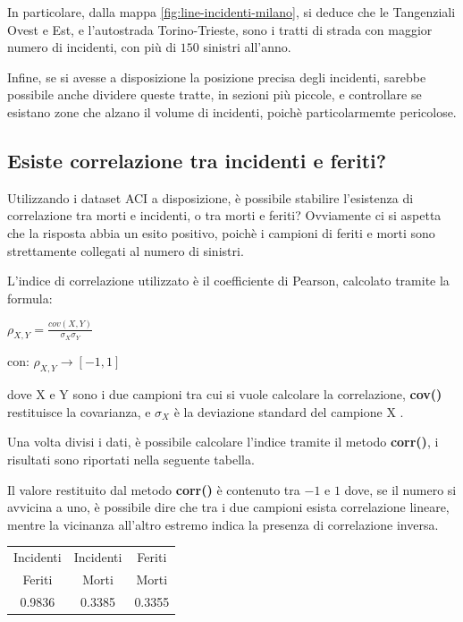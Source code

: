 \documentclass[a4paper,12pt]{report}
\newcommand{\methodstyle}[1]{\textbf{#1}}
\begin{document}
In particolare, dalla mappa \ref{fig:line-incidenti-milano}, si deduce che le 
Tangenziali Ovest e Est, e l'autostrada Torino-Trieste, sono i tratti di 
strada con maggior numero di incidenti, con più di $150$ sinistri all'anno.

Infine, se si avesse a disposizione la posizione precisa degli incidenti, 
sarebbe possibile anche dividere queste tratte, in sezioni più piccole, 
e controllare se esistano zone che alzano il volume di incidenti, poichè 
particolarmemte pericolose.

\subsection{Esiste correlazione tra incidenti e feriti?}

Utilizzando i dataset ACI a disposizione, è possibile stabilire l'esistenza di 
correlazione tra morti e incidenti, o tra morti e feriti?
Ovviamente ci si aspetta che la risposta abbia un esito positivo, poichè 
i campioni di feriti e morti sono strettamente collegati al numero di sinistri.

L'indice di correlazione utilizzato è il coefficiente di Pearson, 
calcolato tramite la formula: 

\begin{center}
    $\rho_{X, Y} = \displaystyle \frac{cov(X, Y)}{\sigma_X \sigma_Y}$
\end{center}

\begin{center}
    con: $\rho_{X, Y} \rightarrow [-1, 1]$
\end{center}

dove X e Y sono i due campioni tra cui si vuole calcolare la correlazione, 
\methodstyle{cov()} restituisce la covarianza, e $\sigma_X$ è la deviazione standard del 
campione X \cite{PROB_E_STATISTICA:3}. 

Una volta divisi i dati, è possibile calcolare l'indice tramite il metodo 
\methodstyle{corr()}, i risultati sono riportati nella seguente tabella.

Il valore restituito dal metodo \methodstyle{corr()} è contenuto tra $-1$ e $1$ dove, 
se il numero si avvicina a uno, è possibile dire che tra i due campioni esista correlazione 
lineare, mentre la vicinanza all'altro estremo indica la presenza di correlazione inversa.

\begin{center}
    \def\arraystretch{1.5}%
    \begin{tabular}{ |c|c|c| } 
    \hline
    Incidenti & Incidenti & Feriti \\ 
    Feriti & Morti & Morti \\ 
    \hline
    0.9836 & 0.3385 & 0.3355 \\ 
    \hline
    \end{tabular}
\end{center}
\end{document}
